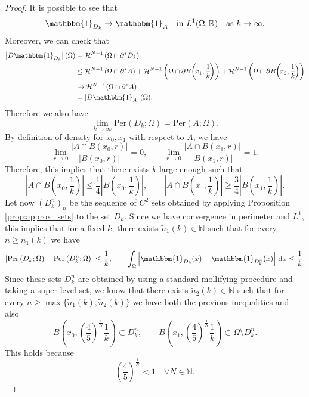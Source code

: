 \documentclass[a4paper, 11pt, reqno]{amsart}
\theoremstyle{plain}
\theoremstyle{definition}
\theoremstyle{remark}
\newcommand{\N}{\mathbb N}
\newcommand{\R}{\mathbb R}
\newcommand{\dd}{\,\mathrm{d}}
\begin{document}
\begin{proof}
It is possible to see that
$$ \mathbbm{1}_{D_k} \to \mathbbm{1}_A \quad \text{in } L^1(\Omega; \R) \quad \text{as } k \to \infty. $$
Moreover, we can check that
\begin{align*}
	\left| D \mathbbm{1}_{D_k} \right| (\Omega) &= \mathcal{H}^{N-1} \left(\Omega \cap \partial^* D_k \right) \\
	&\leq \mathcal{H}^{N-1} \left(\Omega \cap \partial^* A \right) + \mathcal{H}^{N-1} \left(\Omega \cap \partial B \! \left( \! x_1, \frac{1}{k} \! \right) \right) + \mathcal{H}^{N-1} \left(\Omega \cap \partial B \! \left( \! x_2, \frac{1}{k} \! \right) \right) \\
	&\to \mathcal{H}^{N-1} \left(\Omega \cap \partial^* A \right) \\
	&= \left| D \mathbbm{1}_{A} \right| (\Omega).
\end{align*}
Therefore we also have
$$ \lim_{k \to \infty} \mathrm{Per}(D_k;\Omega) = \mathrm{Per}(A;\Omega). $$
By definition of density for $x_0, x_1$ with respect to $A$, we have
$$ \lim_{r \to 0} \frac{|A \cap B(x_0,r)|}{|B(x_0,r)|} = 0, \qquad \lim_{r \to 0} \frac{|A \cap B(x_1,r)|}{|B(x_1,r)|} = 1. $$
Therefore, this implies that there exists $k$ large enough such that
$$ \left| A \cap B \left( x_0, \frac{1}{k} \right) \right| \leq \frac{1}{4} \left| B \left( x_0, \frac{1}{k} \right) \right|, \qquad \left| A \cap B \left( x_1, \frac{1}{k} \right) \right| \geq \frac{3}{4} \left| B \left( x_1, \frac{1}{k} \right) \right|. $$
Let now $(D_k^n)_n$ be the sequence of $C^2$ sets obtained by applying Proposition \ref{prop:approx_sets} to the set $D_k$. Since we have convergence in perimeter and $L^1$, this implies that for a fixed $k$, there exists $\widetilde{n}_1(k) \in \N$ such that for every $n \geq \widetilde{n}_1(k)$ we have
$$ \left| \mathrm{Per} \left( D_k; \Omega \right) - \mathrm{Per} \left( D_k^n; \Omega \right) \right| \leq \frac{1}{k}, \qquad \int_\Omega \left| \mathbbm{1}_{D_k} (x) - \mathbbm{1}_{D_k^n}(x) \right| \dd x \leq \frac{1}{k}. $$
Since these sets $D_k^n$ are obtained by using a standard mollifying procedure and taking a super-level set, we know that there exists $\widetilde{n}_2(k) \in \N$ such that for every $n \geq \max \{ \widetilde{n}_1(k), \widetilde{n}_2(k) \}$ we have both the previous inequalities and also
$$ B \left( x_0, \left( \frac{4}{5} \right)^{\frac{1}{N}} \frac{1}{k} \right) \subset D_k^n, \qquad B \left( x_1, \left( \frac{4}{5} \right)^{\frac{1}{N}} \frac{1}{k} \right) \subset \Omega \setminus D_k^n. $$
This holds because 
$$ \left( \frac{4}{5} \right)^{\frac{1}{N}} < 1 \quad \forall N \in \N. $$


\end{proof}
\end{document}
